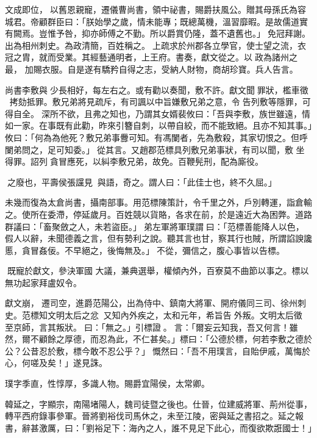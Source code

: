 \begin{pinyinscope}
 文成即位，以舊恩親寵，遷儀曹尚書，領中祕書，賜爵扶風公。贈其母孫氏為容城君。帝顧群臣曰：「朕始學之歲，情未能專；既總萬機，溫習靡暇。是故儒道實有闕焉。豈惟予咎，抑亦師傅之不勤。所以爵賞仍隆，蓋不遺舊也。」免冠拜謝。出為相州刺史。為政清簡，百姓稱之。上疏求於州郡各立學官，使士望之流，衣冠之胄，就而受業。其經藝通明者，上王府。書奏，獻文從之。以政為諸州之最，
 加賜衣服。自是遂有驕矜自得之志，受納人財物，商胡珍寶。兵人告言。



 尚書李敷與少長相好，每左右之。或有勸以奏聞，敷不許。獻文聞罪狀，檻車徵，拷劾抵罪。敷兄弟將見疏斥，有司諷以中旨嫌敷兄弟之意，令告列敷等隱罪，可得自全。深所不欲，且弗之知也，乃謂其女婿裴攸曰：「吾與李敷，族世雖遠，情如一家。在事既有此勸，昨來引簪自刺，以帶自絞，而不能致絕。且亦不知其事。」攸曰：「何為為他死？敷兄弟事釁可知。有馮闌者，先為敷殺，其家切恨之。但呼闌弟問之，足可知委。」從其言。又趙郡范標具列敷兄弟事狀，有司以聞，敷
 坐得罪。詔列貪冒應死，以糾李敷兄弟，故免。百鞭髡刑，配為廝役。



 之廢也，平壽侯張讜見，與語，奇之。謂人曰：「此佳士也，終不久屈。」



 未幾而復為太倉尚書，攝南部事。用范標陳策計，令千里之外，戶別轉運，詣倉輸之。使所在委滯，停延歲月。百姓競以貨賂，各求在前，於是遠近大為困弊。道路群議曰：「畜聚斂之人，未若盜臣。」弟左軍將軍璞謂曰：「范標善能降人以色，假人以辭，未聞德義之言，但有勢利之說。聽其言也甘，察其行也賊，所謂諂諛讒慝，貪冒姦佞。不早絕之，後悔無及。」不從，彌信之，腹心事皆以告標。



 既寵於獻文，參決軍國
 大議，兼典選舉，權傾內外，百寮莫不曲節以事之。標以無功起家拜盧奴令。



 獻文崩，遷司空，進爵范陽公，出為侍中、鎮南大將軍、開府儀同三司、徐州刺史。范標知文明太后之忿，又知內外疾之，太和元年，希旨告外叛。文明太后徵至京師，言其叛狀。曰：「無之。」引標證。言：「爾妄云知我，吾又何言！雖然，爾不顧餘之厚德，而忍為此，不仁甚矣。」標曰：「公德於標，何若李敷之德於公？公昔忍於敷，標今敢不忍公乎？」慨然曰：「吾不用璞言，自貽伊戚，萬悔於心，何嗟及矣！」遂見誅。



 璞字季直，性惇厚，多識人物。賜爵宜陽侯，太常卿。



 韓延之，字顯宗，南陽堵陽人，魏司徒暨之後也。仕晉，位建威將軍、荊州從事，轉平西府錄事參軍。晉將劉裕伐司馬休之，未至江陵，密與延之書招之。延之報書，辭甚激厲，曰：「劉裕足下：海內之人，誰不見足下此心，而復欲欺誑國士！」




\end{pinyinscope}
